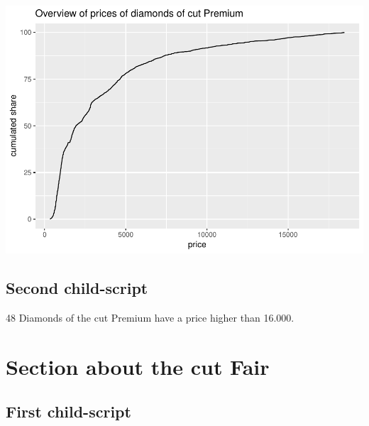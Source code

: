 \documentclass[12pt,]{article}
\newenvironment{Shaded}{\begin{snugshade}}{\end{snugshade}}
\newcommand{\KeywordTok}[1]{\textcolor[rgb]{0.13,0.29,0.53}{\textbf{#1}}}
\newcommand{\DataTypeTok}[1]{\textcolor[rgb]{0.13,0.29,0.53}{#1}}
\newcommand{\DecValTok}[1]{\textcolor[rgb]{0.00,0.00,0.81}{#1}}
\newcommand{\StringTok}[1]{\textcolor[rgb]{0.31,0.60,0.02}{#1}}
\newcommand{\OperatorTok}[1]{\textcolor[rgb]{0.81,0.36,0.00}{\textbf{#1}}}
\newcommand{\NormalTok}[1]{#1}
\begin{document}
\includegraphics{SatRDay_Example_automatedReports_files/figure-latex/unnamed-chunk-4-1.pdf}

\subsection{Second child-script}\label{second-child-script}

\begin{Shaded}
\end{Shaded}

48 Diamonds of the cut Premium have a price higher than 16.000.

\newpage

\section{Section about the cut Fair}\label{section-about-the-cut-fair}

\subsection{First child-script}\label{first-child-script-1}
\end{document}
